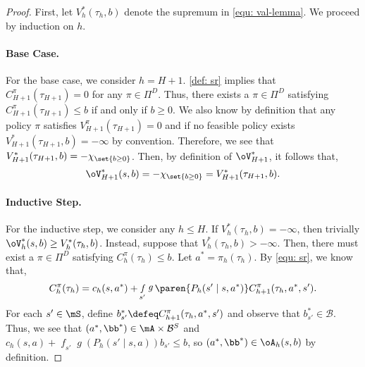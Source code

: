 \documentclass[pdftex, a4paper, 12pt]{article}
\newcommand{\mB}{\mathcal{B}}
\DeclareMathOperator*{\f}{\mathit{f}}
\DeclareMathOperator*{\g}{\mathit{g}}
\begin{document}
\begin{proof}
    First, let $V^*_h(\tau_h, b)$ denote the supremum in \eqref{equ: val-lemma}. We proceed by induction on $h$.

    \paragraph{Base Case.} For the base case, we consider $h = H+1$. \cref{def: sr} implies that $C_{H+1}^{\pi}(\tau_{H+1}) = 0$ for any $\pi \in \Pi^D$. Thus, there exists a $\pi \in \Pi^D$ satisfying $C_{H+1}^{\pi}(\tau_{H+1}) \leq b$ if and only if $b \geq 0$. We also know by definition that any policy $\pi$ satisfies $V^{\pi}_{H+1}(\tau_{H+1}) = 0$ and if no feasible policy exists $V^*_{H+1}(\tau_{H+1},b) = -\infty$ by convention. Therefore, we see that $V^*_{H+1}(\tau_{H+1},b) = -\chi_{\set{b \geq 0}}$. Then, by definition of $\oV^*_{H+1}$, it follows that,
    \begin{equation*}
        \oV_{H+1}^*(s,b) = -\chi_{\set{b \geq 0}} = V^*_{H+1}(\tau_{H+1},b).
    \end{equation*}

    \paragraph{Inductive Step.} For the inductive step, we consider any $h \leq H$. If $V^*_h(\tau_h,b) = -\infty$, then trivially $\oV^*_h(s,b) \geq V^*_h(\tau_h, b)$. Instead, suppose that $V^*_h(\tau_h,b) > -\infty$. Then, there must exist a $\pi \in \Pi^D$ satisfying $C_h^{\pi}(\tau_h) \leq b$. Let $a^* = \pi_h(\tau_h)$. By \eqref{equ: sr}, we know that,
    \begin{equation*}
        C_h^{\pi}(\tau_h) = c_h(s,a^*) + \f_{s'} \g\paren{P_h(s' \mid s,a^*)} C_{h+1}^{\pi}(\tau_h, a^*, s').
    \end{equation*}
    For each $s' \in \mS$, define $b_{s'}^* \defeq C_{h+1}^{\pi}(\tau_h, a^*, s')$ and observe that $b_{s'}^* \in \mB$. Thus, we see that $(a^*,\bb^*) \in \mA \times \mB^{S}$ and $c_h(s,a) + \f_{s'} \g(P_h(s' \mid s,a)) b_{s'} \leq b$, so $(a^*,\bb^*) \in \oA_h(s,b)$ by definition.


\end{proof}
\end{document}
